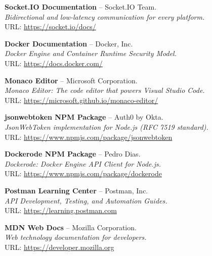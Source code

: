 \documentclass[12pt,a4paper]{report}
\begin{document}
\begin{enumerate}[leftmargin=*, label={[\arabic*]}]
  \item \textbf{Socket.IO Documentation} -- Socket.IO Team. \\
  \textit{Bidirectional and low-latency communication for every platform.} \\
  URL: \url{https://socket.io/docs/}

  \item \textbf{Docker Documentation} -- Docker, Inc. \\
  \textit{Docker Engine and Container Runtime Security Model.} \\
  URL: \url{https://docs.docker.com/}

  \item \textbf{Monaco Editor} -- Microsoft Corporation. \\
  \textit{Monaco Editor: The code editor that powers Visual Studio Code.} \\
  URL: \url{https://microsoft.github.io/monaco-editor/}

  \item \textbf{jsonwebtoken NPM Package} -- Auth0 by Okta. \\
  \textit{JsonWebToken implementation for Node.js (RFC 7519 standard).} \\
  URL: \url{https://www.npmjs.com/package/jsonwebtoken}

  \item \textbf{Dockerode NPM Package} -- Pedro Dias. \\
  \textit{Dockerode: Docker Engine API Client for Node.js.} \\
  URL: \url{https://www.npmjs.com/package/dockerode}

  \item \textbf{Postman Learning Center} -- Postman, Inc. \\
  \textit{API Development, Testing, and Automation Guides.} \\
  URL: \url{https://learning.postman.com}

  \item \textbf{MDN Web Docs} -- Mozilla Corporation. \\
  \textit{Web technology documentation for developers.} \\
  URL: \url{https://developer.mozilla.org}
\end{enumerate}

\clearpage

\end{document}
